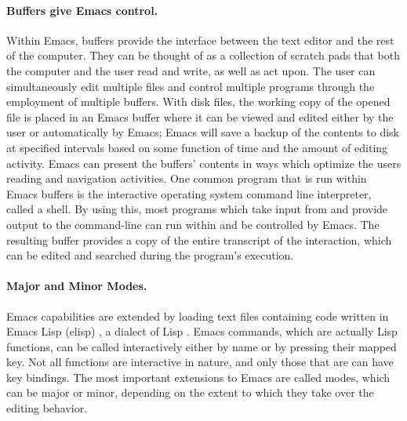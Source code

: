 \documentclass{article}
\begin{document}
\paragraph{Buffers give Emacs control.}
Within Emacs, buffers provide the interface between the text editor
and the rest of the computer.  They can be thought of as a collection
of scratch pads that both the computer and the user read and write, as
well as act upon.  The user can simultaneously edit multiple files and
control multiple programs through the employment of multiple buffers.
With disk files, the working copy of the opened file is placed in an
Emacs buffer where it can be viewed and edited either by the user or
automatically by Emacs; Emacs will save a backup of the contents to disk at
specified intervals based on some function of time and the amount of
editing activity.  Emacs can present the buffers' contents in ways
which optimize the users reading and navigation activities.  One
common program that is run within Emacs buffers is the interactive
operating system command line interpreter, called a shell.  By using
this, most programs which take input from and provide output to the
command-line can run within and be controlled by Emacs.
The resulting buffer provides a copy of the entire transcript of the
interaction, which can be edited and searched during the program's 
execution.

\paragraph{Major and Minor Modes.}
Emacs capabilities are extended by loading text files containing code
written in Emacs Lisp (elisp) \citep{RChassell1999}, a dialect of Lisp
\citep{PGraham:1996}.  Emacs commands, which are actually Lisp
functions, can be called interactively either by name or by pressing
their mapped key.  Not all functions are interactive in nature, and
only those that are can have key bindings.  The most important
extensions to Emacs are called modes, which can be major or minor,
depending on the extent to which they take over the editing behavior.
\end{document}
